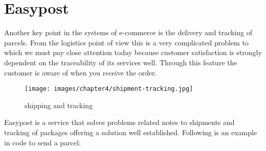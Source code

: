 \section{Easypost}
\label{sec:easypost}
Another key point in the systems of e-commerce is the delivery and tracking of parcels. From the logistics point of view this is a very complicated problem to which we must pay close attention today because customer satisfaction is strongly dependent on the traceability of its services well. Through this feature the customer is aware of when you receive the order.
\begin{figure}[htb]
  \centering
  \texttt{[image: images/chapter4/shipment-tracking.jpg]}\hfill
  \caption[shipping and tracking]{shipping and tracking}
\label{fig:shipping_tracking}
\end{figure}
Easypost is a service that solves problems related notes to shipments and tracking of packages offering a solution well established. Following is an example in code to send a parcel:
